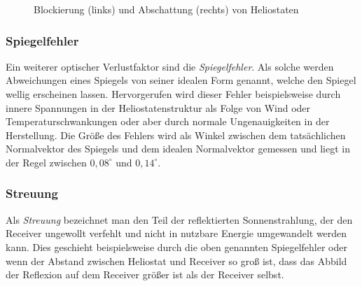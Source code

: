 \begin{figure}[h!]
    \centering
    \setlength{\fboxsep}{1pt}
    \setlength{\fboxrule}{1pt}
\caption[Blockierung und Abschattung von Heliostaten]{Blockierung (links) und Abschattung (rechts) von Heliostaten \cite[S.15]{DissBelhomme}}
    \label{fig_AbschattungBlockieren}
\end{figure}

\subsubsection*{Spiegelfehler} \label{subsubsec_Spiegelfehler}
Ein weiterer optischer Verlustfaktor sind die \textit{Spiegelfehler}.
Als solche werden Abweichungen eines Spiegels von seiner idealen Form genannt, welche den Spiegel wellig erscheinen lassen.
Hervorgerufen wird dieser Fehler beispielsweise durch innere Spannungen in der Heliostatenstruktur als Folge von Wind oder Temperaturschwankungen oder aber durch normale Ungenauigkeiten in der Herstellung.
Die Größe des Fehlers wird als Winkel zwischen dem tatsächlichen Normalvektor des Spiegels und dem idealen Normalvektor gemessen und liegt in der Regel zwischen $0,08^\circ$ und $0,14^\circ$. \cite[S.16]{DissBelhomme}

\subsubsection*{Streuung} \label{subsubsec_Streuung}
Als \textit{Streuung} bezeichnet man den Teil der reflektierten Sonnenstrahlung, der den Receiver ungewollt verfehlt und nicht in nutzbare Energie umgewandelt werden kann.
Dies geschieht beispielsweise durch die oben genannten Spiegelfehler oder wenn der Abstand zwischen Heliostat und Receiver so groß ist, dass das Abbild der Reflexion auf dem Receiver größer ist als der Receiver selbst. \cite[S.15-16]{DissBelhomme}

